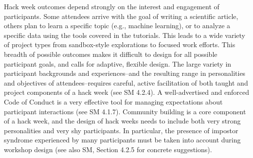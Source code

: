Hack week outcomes depend strongly on the interest and engagement of participants.
Some attendees arrive with the goal of writing a scientific article, others plan to learn a specific topic (e.g., machine learning), or to analyze a specific data using the tools covered in the tutorials.
This leads to a wide variety of project types from sandbox-style explorations to focused work efforts.
This breadth of possible outcomes makes it difficult to design for all possible participant goals, and calls for adaptive, flexible design.
The large variety in participant backgrounds and experiences--and the resulting range in personalities and objectives of attendees--requires careful, active facilitation of both taught and project components of a hack week (see SM 4.2.4). A well-advertised and enforced Code of Conduct is a very effective tool for managing expectations about participant interactions (see SM 4.1.7).
Community building is a core component of a hack week, and the design of hack weeks needs to include both very strong personalities and very shy participants. In particular, the presence of impostor syndrome experienced by many participants must be taken into account during workshop design (see also SM, Section 4.2.5 for concrete suggestions).